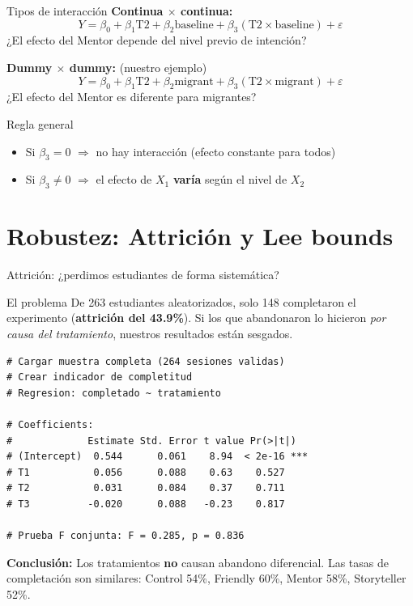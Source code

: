 \documentclass[aspectratio=169, 11pt]{beamer}
\begin{document}
\begin{frame}{Tipos de interacción}
\textbf{Continua $\times$ continua:}
\[
Y = \beta_0 + \beta_1 \text{T2} + \beta_2 \text{baseline} + \beta_3 (\text{T2} \times \text{baseline}) + \varepsilon
\]
¿El efecto del Mentor depende del nivel previo de intención?

\vspace{0.3cm}
\textbf{Dummy $\times$ dummy:} (nuestro ejemplo)
\[
Y = \beta_0 + \beta_1 \text{T2} + \beta_2 \text{migrant} + \beta_3 (\text{T2} \times \text{migrant}) + \varepsilon
\]
¿El efecto del Mentor es diferente para migrantes?

\vspace{0.3cm}
\begin{block}{Regla general}
\begin{itemize}
  \item Si $\beta_3 = 0$ $\Rightarrow$ no hay interacción (efecto constante para todos)
  \item Si $\beta_3 \neq 0$ $\Rightarrow$ el efecto de $X_1$ \textbf{varía} según el nivel de $X_2$
\end{itemize}
\end{block}
\end{frame}

\section{Robustez: Attrición y Lee bounds}

\begin{frame}[fragile]{Attrición: ¿perdimos estudiantes de forma sistemática?}
\begin{block}{El problema}
\small
De 263 estudiantes aleatorizados, solo 148 completaron el experimento (\textbf{attrición del 43.9\%}). Si los que abandonaron lo hicieron \textit{por causa del tratamiento}, nuestros resultados están sesgados.
\end{block}

\begin{lstlisting}[basicstyle=\ttfamily\scriptsize]
# Cargar muestra completa (264 sesiones validas)
# Crear indicador de completitud
# Regresion: completado ~ tratamiento

# Coefficients:
#             Estimate Std. Error t value Pr(>|t|)
# (Intercept)  0.544      0.061    8.94  < 2e-16 ***
# T1           0.056      0.088    0.63    0.527
# T2           0.031      0.084    0.37    0.711
# T3          -0.020      0.088   -0.23    0.817

# Prueba F conjunta: F = 0.285, p = 0.836
\end{lstlisting}

\vspace{0.1cm}
\textbf{Conclusión:} Los tratamientos \textbf{no} causan abandono diferencial. Las tasas de completación son similares: Control 54\%, Friendly 60\%, Mentor 58\%, Storyteller 52\%.
\end{frame}
\end{document}
